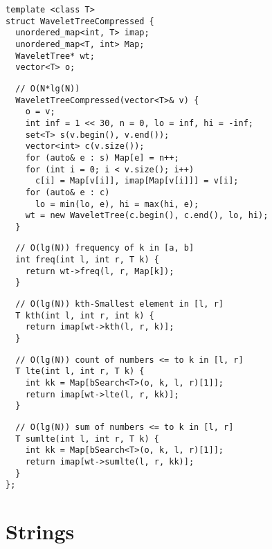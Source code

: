 \documentclass[twoside]{article}
\begin{document}
\begin{multicols*}{2}
\begin{verbatim}
template <class T>
struct WaveletTreeCompressed {
  unordered_map<int, T> imap;
  unordered_map<T, int> Map;
  WaveletTree* wt;
  vector<T> o;
\end{verbatim}
\vspace{-12pt}
\begin{verbatim}
  // O(N*lg(N))
  WaveletTreeCompressed(vector<T>& v) {
    o = v;
    int inf = 1 << 30, n = 0, lo = inf, hi = -inf;
    set<T> s(v.begin(), v.end());
    vector<int> c(v.size());
    for (auto& e : s) Map[e] = n++;
    for (int i = 0; i < v.size(); i++)
      c[i] = Map[v[i]], imap[Map[v[i]]] = v[i];
    for (auto& e : c)
      lo = min(lo, e), hi = max(hi, e);
    wt = new WaveletTree(c.begin(), c.end(), lo, hi);
  }
\end{verbatim}
\vspace{-12pt}
\begin{verbatim}
  // O(lg(N)) frequency of k in [a, b]
  int freq(int l, int r, T k) {
    return wt->freq(l, r, Map[k]);
  }
\end{verbatim}
\vspace{-12pt}
\begin{verbatim}
  // O(lg(N)) kth-Smallest element in [l, r]
  T kth(int l, int r, int k) {
    return imap[wt->kth(l, r, k)];
  }
\end{verbatim}
\vspace{-12pt}
\begin{verbatim}
  // O(lg(N)) count of numbers <= to k in [l, r]
  T lte(int l, int r, T k) {
    int kk = Map[bSearch<T>(o, k, l, r)[1]];
    return imap[wt->lte(l, r, kk)];
  }
\end{verbatim}
\vspace{-12pt}
\begin{verbatim}
  // O(lg(N)) sum of numbers <= to k in [l, r]
  T sumlte(int l, int r, T k) {
    int kk = Map[bSearch<T>(o, k, l, r)[1]];
    return imap[wt->sumlte(l, r, kk)];
  }
};
\end{verbatim}

\sectionfont{\bfseries\sffamily\centering\Huge}
\vspace{1em}
\section*{Strings}
\vspace{3em}
\subsectionfont{\bfseries\sffamily\centering\LARGE}
\vspace{0em}

\end{multicols*}
\end{document}
